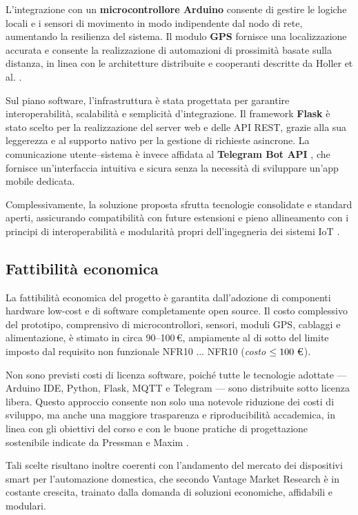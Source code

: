 L’integrazione con un \textbf{microcontrollore Arduino} \cite{ArduinoRef} consente di gestire le logiche locali e i sensori di movimento in modo indipendente dal nodo di rete, aumentando la resilienza del sistema.
Il modulo \textbf{GPS} fornisce una localizzazione accurata e consente la realizzazione di automazioni di prossimità basate sulla distanza, in linea con le architetture distribuite e cooperanti descritte da Holler et al. \cite{Holler2014}.

Sul piano software, l’infrastruttura è stata progettata per garantire interoperabilità, scalabilità e semplicità d’integrazione.  
Il framework \textbf{Flask} \cite{Flask2024} è stato scelto per la realizzazione del server web e delle API REST, grazie alla sua leggerezza e al supporto nativo per la gestione di richieste asincrone.  
La comunicazione utente–sistema è invece affidata al \textbf{Telegram Bot API} \cite{TelegramAPI}, che fornisce un’interfaccia intuitiva e sicura senza la necessità di sviluppare un’app mobile dedicata.  

Complessivamente, la soluzione proposta sfrutta tecnologie consolidate e standard aperti, assicurando compatibilità con future estensioni e pieno allineamento con i principi di interoperabilità e modularità propri dell’ingegneria dei sistemi IoT \cite{Palattella2016}.

\subsection{Fattibilità economica}
La fattibilità economica del progetto è garantita dall’adozione di componenti hardware low-cost e di software completamente open source.  
Il costo complessivo del prototipo, comprensivo di microcontrollori, sensori, moduli GPS, cablaggi e alimentazione, è stimato in circa 90–100\,€, ampiamente al di sotto del limite imposto dal requisito non funzionale NFR10 ... NFR10 (\textit{costo $\leq 100~\text{\texteuro}$}).


Non sono previsti costi di licenza software, poiché tutte le tecnologie adottate — Arduino IDE, Python, Flask, MQTT e Telegram — sono distribuite sotto licenza libera.  
Questo approccio consente non solo una notevole riduzione dei costi di sviluppo, ma anche una maggiore trasparenza e riproducibilità accademica, in linea con gli obiettivi del corso e con le buone pratiche di progettazione sostenibile indicate da Pressman e Maxim \cite{Pressman2019}.  

Tali scelte risultano inoltre coerenti con l’andamento del mercato dei dispositivi smart per l’automazione domestica, che secondo Vantage Market Research \cite{Vantage2023} è in costante crescita, trainato dalla domanda di soluzioni economiche, affidabili e modulari.

